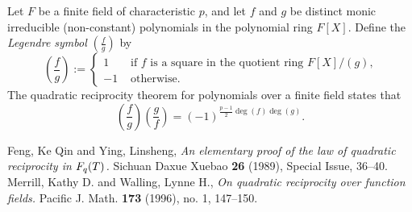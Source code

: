 \documentclass[12pt]{article}
\begin{document}
Let $F$ be a finite field of characteristic $p$, and let $f$ and $g$ be distinct monic irreducible (non-constant) polynomials in the polynomial ring $F[X]$. Define the {\em Legendre symbol} $\left(\frac{f}{g}\right)$ by
$$
\left(\frac{f}{g}\right) :=
\begin{cases}
1 & \text{ if $f$ is a square in the quotient ring $F[X]/(g)$,} \\
-1 & \text{ otherwise.}
\end{cases}
$$
The quadratic reciprocity theorem for polynomials over a finite field states that
$$
\left(\frac{f}{g}\right) \left(\frac{g}{f}\right) = (-1)^{\frac{p-1}{2} \deg(f) \deg(g)}.
$$
\begin{thebibliography}{9}
Feng, Ke Qin and Ying, Linsheng,
{\em An elementary proof of the law of quadratic reciprocity in $F\sb q(T)$.}
Sichuan Daxue Xuebao {\bf 26} (1989), Special Issue, 36--40.
Merrill, Kathy D. and Walling, Lynne H.,
{\em On quadratic reciprocity over function fields.}
Pacific J. Math. {\bf 173} (1996), no. 1, 147--150.
\end{thebibliography}
\end{document}
